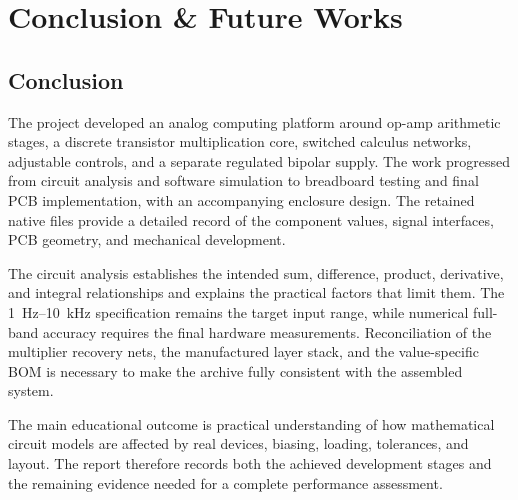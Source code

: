 \documentclass[11pt,a4paper]{article}
\begin{document}
\section{Conclusion \& Future Works}
\subsection{Conclusion}
The project developed an analog computing platform around op-amp arithmetic stages, a discrete transistor multiplication core, switched calculus networks, adjustable controls, and a separate regulated bipolar supply. The work progressed from circuit analysis and software simulation to breadboard testing and final PCB implementation, with an accompanying enclosure design. The retained native files provide a detailed record of the component values, signal interfaces, PCB geometry, and mechanical development.

The circuit analysis establishes the intended sum, difference, product, derivative, and integral relationships and explains the practical factors that limit them. The 1~Hz--10~kHz specification remains the target input range, while numerical full-band accuracy requires the final hardware measurements. Reconciliation of the multiplier recovery nets, the manufactured layer stack, and the value-specific BOM is necessary to make the archive fully consistent with the assembled system.

The main educational outcome is practical understanding of how mathematical circuit models are affected by real devices, biasing, loading, tolerances, and layout. The report therefore records both the achieved development stages and the remaining evidence needed for a complete performance assessment.
\end{document}
